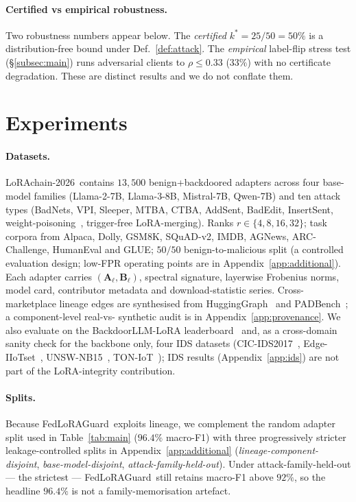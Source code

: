 \documentclass[11pt]{article}
\theoremstyle{plain}
\theoremstyle{definition}
\theoremstyle{remark}
\newcommand{\modelname}{FedLoRAGuard}
\newcommand{\benchname}{LoRAchain-2026}
\begin{document}
\paragraph{Certified vs empirical robustness.}
Two robustness numbers appear below. The \emph{certified}
$k^*\!=\!25/50\!=\!50\%$ is a distribution-free bound under
Def.~\ref{def:attack}. The \emph{empirical} label-flip stress
test (\S\ref{subsec:main}) runs adversarial clients to
$\rho\!\le\!0.33$ ($33\%$) with no certificate degradation. These
are distinct results and we do not conflate them.

\section{Experiments}
\label{sec:experiments}

\paragraph{Datasets.}
\benchname\ contains $13{,}500$ benign+backdoored adapters across
four base-model families (Llama-2-7B, Llama-3-8B, Mistral-7B,
Qwen-7B) and ten attack types (BadNets, VPI, Sleeper, MTBA,
CTBA, AddSent, BadEdit, InsertSent, weight-poisoning~\cite{kurita2020weight}, trigger-free
LoRA-merging). Ranks $r\!\in\!\{4,8,16,32\}$; task corpora from
Alpaca, Dolly, GSM8K, SQuAD-v2, IMDB, AGNews, ARC-Challenge,
HumanEval and GLUE; $50/50$ benign-to-malicious split (a
controlled evaluation design; low-FPR operating points are in
Appendix~\ref{app:additional}). Each adapter carries
$(\mathbf{A}_\ell,\mathbf{B}_\ell)$, spectral signature, layerwise
Frobenius norms, model card, contributor metadata and
download-statistic series. Cross-marketplace lineage edges are
synthesised from HuggingGraph~\cite{rahman2025hugginggraph} and
PADBench~\cite{sun2025peftguard}; a component-level real-vs-
synthetic audit is in Appendix~\ref{app:provenance}. We also
evaluate on the BackdoorLLM-LoRA
leaderboard~\cite{li2025backdoorllm} and, as a cross-domain
sanity check for the backbone only, four IDS datasets
(CIC-IDS2017~\cite{sharafaldin2018toward},
Edge-IIoTset~\cite{ferrag2022edge},
UNSW-NB15~\cite{moustafa2015unsw},
TON-IoT~\cite{moustafa2021ton}); IDS results
(Appendix~\ref{app:ids}) are not part of the LoRA-integrity
contribution.

\paragraph{Splits.}
Because \modelname\ exploits lineage, we complement the random
adapter split used in Table~\ref{tab:main} ($96.4\%$ macro-F1)
with three progressively stricter leakage-controlled splits in
Appendix~\ref{app:additional} (\emph{lineage-component-disjoint},
\emph{base-model-disjoint}, \emph{attack-family-held-out}). Under
attack-family-held-out --- the strictest --- \modelname\ still
retains macro-F1 above $92\%$, so the headline $96.4\%$ is not a
family-memorisation artefact.
\end{document}

